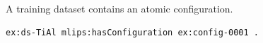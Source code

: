 A training dataset contains an atomic configuration.
\begin{lstlisting}[language=turtle]
ex:ds-TiAl mlips:hasConfiguration ex:config-0001 .
\end{lstlisting}

